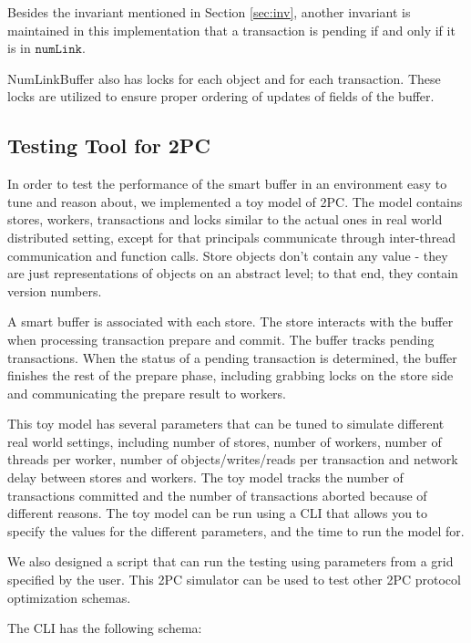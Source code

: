 \documentclass{article}
\begin{document}
Besides the invariant mentioned in Section \ref{sec:inv}, another invariant is 
maintained in this implementation that a transaction is pending if and only if 
it is in $\mathtt{numLink}$.

NumLinkBuffer also has locks for each object and for each transaction. These
locks are utilized to ensure proper ordering of updates of fields of the buffer.



\subsection{Testing Tool for 2PC}
In order to test the performance of the smart buffer in an environment easy to
tune and reason about, we implemented a toy model of 2PC. The model contains
stores, workers, transactions and locks similar to the actual ones in real world
distributed setting, except for that principals communicate through inter-thread
communication and function calls. Store objects don't contain any value - they
are just representations of objects on an abstract level; to that end, they
contain version numbers.

A smart buffer is associated with each store. The store interacts with the
buffer when processing transaction prepare and commit. The buffer tracks pending
transactions. When the status of a pending transaction is determined, the buffer
finishes the rest of the prepare phase, including grabbing locks on the store
side and communicating the prepare result to workers.

This toy model has several parameters that can be tuned to simulate different
real world settings, including number of stores, number of workers, number of
threads per worker, number of objects/writes/reads per transaction and network
delay between stores and workers. The toy model tracks the number of
transactions committed and the number of transactions aborted because of
different reasons. The toy model can be run using a CLI that allows you to
specify the values for the different parameters, and the time to run the model
for.

We also designed a script that can run the testing using parameters from a grid
specified by the user. This 2PC simulator can be used to test other 2PC protocol
optimization schemas.

The CLI has the following schema:
\end{document}
